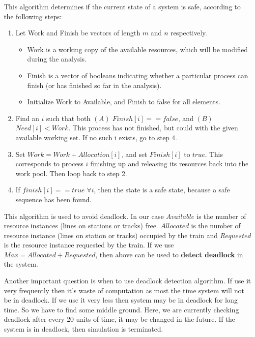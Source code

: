 This algorithm determines if the current state of a system is safe, according to the following steps:
\begin{enumerate}
\item Let Work and Finish be vectors of length $m$ and $n$ respectively.
\begin{itemize}
\item Work is a working copy of the available resources, which will be modified during the analysis.
\item Finish is a vector of booleans indicating whether a particular process can finish (or has finished so far in the analysis).
\item Initialize Work to Available, and Finish to false for all elements.
\end{itemize}
\item Find an $i$ such that both $(A)$ $Finish[ i ] == false$, and $(B)$ $Need[i] < Work$. This process has not finished, but could with the given available working set. If no such i exists, go to step 4.
\item Set $Work = Work + Allocation[i]$, and set $Finish[i]$ to $true$. This corresponds to process $i$ finishing up and releasing its resources back 
        into the work pool. Then loop back to step 2.
\item If $finish[i] == true$  $ \forall i$, then the state is a safe state, because a safe sequence has been found.
\end{enumerate}

This algorithm is used to avoid deadlock. 
In our case $Available$ is the number of resource instances (lines 
on stations or tracks) free. $Allocated$ is the number of resource instance (lines on station or tracks) occupied 
by the train and $Requested$ is the resource instance requested by the train. 
If we use $Max = Allocated + Requested$, then above can be used to \textbf{detect deadlock} in the system.

\vspace{0.25cm}
Another important question is when to use deadlock detection algorithm. If use it very frequently 
then it's waste of computation as most the time system will not be in deadlock. If we use it very less
then system may be in deadlock for long time. So we have to find some middle ground. Here, we are currently checking deadlock
after every 20 units of time, it may be changed in the future. If the system is in deadlock, then 
simulation is terminated.

\vspace{5cm}
